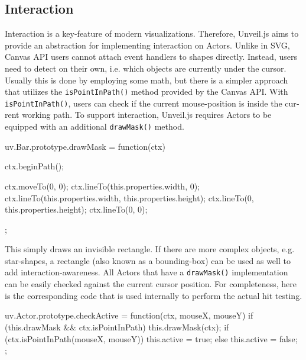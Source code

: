 \begin{english}
\subsection{Interaction}

Interaction is a key-feature of modern visualizations. Therefore, Unveil.js aims to provide an abstraction for implementing interaction on Actors. Unlike in SVG, Canvas API users cannot attach event handlers to shapes directly. Instead, users need to detect on their own, i.e. which objects are currently under the cursor. Usually this is done by employing some math, but there is a simpler approach that utilizes the \texttt{isPointInPath()} method provided by the Canvas API. With \texttt{isPointInPath()}, users can check if the current mouse-position is inside the current working path. To support interaction, Unveil.js requires Actors to be equipped with an additional \texttt{drawMask()} method.


\begin{program}
\begin{CppSourceCode}
uv.Bar.prototype.drawMask = function(ctx) {
  ctx.beginPath();

  ctx.moveTo(0, 0);
  ctx.lineTo(this.properties.width, 0);
  ctx.lineTo(this.properties.width, this.properties.height);
  ctx.lineTo(0, this.properties.height);
  ctx.lineTo(0, 0);
};
\end{CppSourceCode}
\end{program}

\SuperPar This simply draws an invisible rectangle. If there are more complex objects, e.g. star-shapes, a rectangle (also known as a bounding-box) can be used as well to add interaction-awareness. All Actors that have a \texttt{drawMask()} implementation can be easily checked against the current cursor position. For completeness, here is the corresponding code that is used internally to perform the actual hit testing.


\begin{program}
\begin{CppSourceCode}
uv.Actor.prototype.checkActive = function(ctx, mouseX, mouseY) {
  if (this.drawMask && ctx.isPointInPath) {
    this.drawMask(ctx);
    if (ctx.isPointInPath(mouseX, mouseY))
      this.active = true;
    else
      this.active = false;
  }
};
\end{CppSourceCode}
\end{program}




\end{english}
